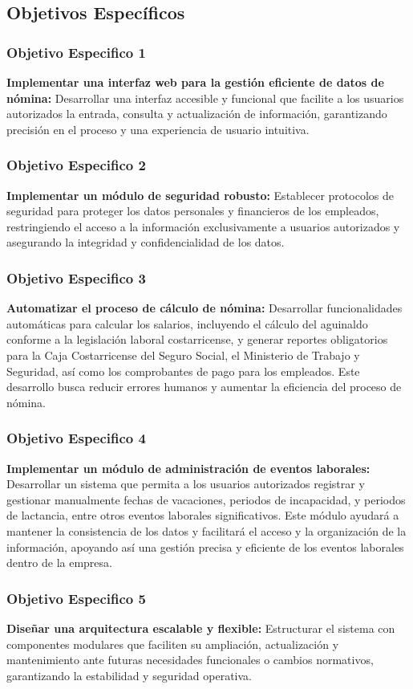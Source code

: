\subsection{Objetivos Específicos}

\subsubsection*{Objetivo Especifico 1}
\textbf{Implementar una interfaz web para la gestión eficiente de datos de nómina:} Desarrollar una interfaz accesible y
funcional que facilite a los usuarios autorizados la entrada, consulta y actualización de información, garantizando precisión en el proceso y una experiencia de usuario intuitiva.


\subsubsection*{Objetivo Especifico 2}
\textbf{Implementar un módulo de seguridad robusto:} Establecer protocolos de
seguridad para proteger los datos personales y financieros de los empleados,
restringiendo el acceso a la información exclusivamente a usuarios autorizados
y asegurando la integridad y confidencialidad de los datos.

\newpage

\subsubsection*{Objetivo Especifico 3}
\textbf{Automatizar el proceso de cálculo de nómina:} Desarrollar
funcionalidades automáticas para calcular los salarios, incluyendo el cálculo del aguinaldo conforme a la legislación laboral costarricense, y
generar reportes obligatorios para la Caja Costarricense del
Seguro Social, el Ministerio de Trabajo y Seguridad, así como los
comprobantes de pago para los empleados. Este desarrollo busca reducir
errores humanos y aumentar la eficiencia del proceso de nómina.


\subsubsection*{Objetivo Especifico 4}
\textbf{Implementar un módulo de administración de eventos laborales:} Desarrollar
un sistema que permita a los usuarios autorizados registrar y gestionar
manualmente fechas de vacaciones, periodos de incapacidad, y periodos de
lactancia, entre otros eventos laborales significativos. Este módulo ayudará
a mantener la consistencia de los datos y facilitará el acceso y la organización
de la información, apoyando así una gestión precisa y eficiente de los eventos
laborales dentro de la empresa.

\subsubsection*{Objetivo Especifico 5}
\textbf{Diseñar una arquitectura escalable y flexible:} Estructurar el sistema con
componentes modulares que faciliten su ampliación, actualización y mantenimiento
ante futuras necesidades funcionales o cambios normativos, garantizando la estabilidad
y seguridad operativa.
